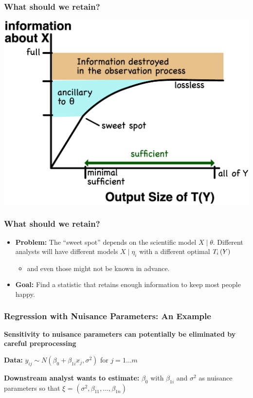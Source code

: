 \documentclass[10pt, compress]{beamer}
\begin{document}
\begin{frame}[fragile]
    \frametitle{What should we retain?}
    \includegraphics[width=\textwidth]{assets/information.eps}
\end{frame}

\begin{frame}[fragile]
    \frametitle{What should we retain?}
    \begin{itemize}
        \item \textbf{Problem:} The “sweet spot” depends on the scientific model $X \mid \theta$. Different analysts will have different models $X \mid \eta_i$ with a different optimal $T_i\del{Y}$
            \begin{itemize}
                \item and even those might not be known in advance.
            \end{itemize}
        \item \textbf{Goal:} Find a statistic that retains enough information to keep most people happy.
    \end{itemize}
\end{frame}

\begin{frame}[fragile]

    \frametitle{Regression with Nuisance Parameters: An Example}
    
    \textbf{Sensitivity to nuisance parameters can potentially be eliminated by careful preprocessing}

    \vspace*{5mm}
    
    \textbf{Data:} $y_{ij} \sim N(\beta_0 + \beta_{1i}x_j, \sigma^2)$ for $j = 1 \ldots m$
    
    \textbf{Downstream analyst wants to estimate:} $\beta_0$ with $\beta_{1i}$ and $\sigma^2$ as nuisance parameters so that $\xi$ = $(\sigma^2, \beta_{11}, ..., \beta_{1n})$
    
\end{frame}
\end{document}
